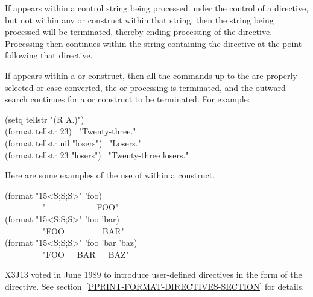 \begin{flushdesc}
If \cd{{\Xtilde}{\Xcircumflex}} appears within a control string being processed
under the control of a  directive, but not within
any \cd{{\Xtilde}{\Xlbrace}} or \cd{{\Xtilde}<} construct within that string,
then the string being
processed will be terminated, thereby ending processing
of the  directive.  Processing then
continues within the string
containing the  directive at the point following that directive.

If \cd{{\Xtilde}{\Xcircumflex}} appears within a \cd{{\Xtilde}{\Xlbracket}} or \cd{{\Xtilde}(} construct,
then all the commands up to the \cd{{\Xtilde}{\Xcircumflex}} are properly selected
or case-converted, the \cd{{\Xtilde}{\Xlbracket}} or \cd{{\Xtilde}(} processing is terminated,
and the outward search continues for a \cd{{\Xtilde}{\Xlbrace}} or \cd{{\Xtilde}<} construct
to be terminated.  For example:
\begin{lisp}
(setq tellstr "{\Xtilde}{\Xatsign}({\Xtilde}{\Xatsign}{\Xlbracket}{\Xtilde}R{\Xtilde}{\Xrbracket}{\Xtilde}{\Xcircumflex} {\Xtilde}A.{\Xtilde})") \\
(format {\false} tellstr 23) \EV\ "Twenty-three." \\
(format {\false} tellstr nil "losers") \EV\ "Losers." \\
(format {\false} tellstr 23 "losers") \EV\ "Twenty-three losers."
\end{lisp}

Here are some examples of the use of \cd{{\Xtilde}{\Xcircumflex}} within a \cd{{\Xtilde}<} construct.
\begin{lisp}
(format {\false} "{\Xtilde}15<{\Xtilde}S{\Xtilde};{\Xtilde}{\Xcircumflex}{\Xtilde}S{\Xtilde};{\Xtilde}{\Xcircumflex}{\Xtilde}S{\Xtilde}>" 'foo) \\
~~~~~~~~\EV\  "~~~~~~~~~~~~FOO" \\
(format {\false} "{\Xtilde}15<{\Xtilde}S{\Xtilde};{\Xtilde}{\Xcircumflex}{\Xtilde}S{\Xtilde};{\Xtilde}{\Xcircumflex}{\Xtilde}S{\Xtilde}>" 'foo 'bar) \\
~~~~~~~~\EV\  "FOO~~~~~~~~~BAR" \\
(format {\false} "{\Xtilde}15<{\Xtilde}S{\Xtilde};{\Xtilde}{\Xcircumflex}{\Xtilde}S{\Xtilde};{\Xtilde}{\Xcircumflex}{\Xtilde}S{\Xtilde}>" 'foo 'bar 'baz) \\
~~~~~~~~\EV\  "FOO~~~BAR~~~BAZ"
\end{lisp}
\end{flushdesc}

\begin{new}
X3J13 voted in June 1989 
to introduce user-defined directives in the form of the
 directive.
See section~\ref{PPRINT-FORMAT-DIRECTIVES-SECTION} for details.
\end{new}

